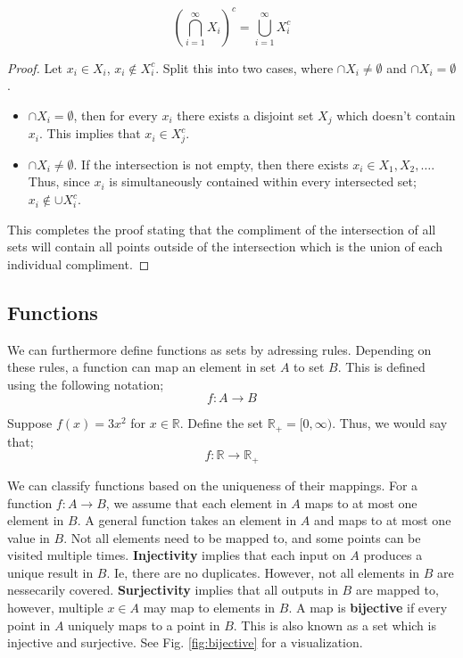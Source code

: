 \begin{theorem}
    \begin{equation}
            \left(\bigcap_{i=1}^\infty X_i\right)^c =     \bigcup_{i=1}^\infty X_i^c 
    \end{equation}
    \begin{proof}
        Let $x_i \in X_i$, $x_i\notin X_i^c$. Split this into two cases, where $\cap X_i \neq \emptyset$ and $\cap X_i = \emptyset$. 
        \begin{itemize}
            \item $\cap X_i = \emptyset$, then for every $x_i$ there exists a disjoint set $X_j$ which doesn't contain $x_i$. This implies that $x_i \in X^c_j$.
            \item $\cap X_i \neq \emptyset$. If the intersection is not empty, then there exists $x_i \in X_1, X_2, \dots$. Thus, since $x_i$ is simultaneously contained within every intersected set;  $x_i \notin \cup X_i^c$.
        \end{itemize}
        This completes the proof stating that the compliment of the intersection of all sets will contain all points outside of the intersection which is the union of each individual compliment. 
    \end{proof}
\end{theorem}

\subsection{Functions}

We can furthermore define functions as sets by adressing rules. Depending on these rules, a function can map an element in set $A$ to set $B$. This is defined using the following notation;
\begin{equation}
    f : A \rightarrow B
\end{equation}

\begin{example}
    Suppose $f(x) = 3x^2$ for $x\in \mathbb{R}$. Define the set $\mathbb{R}_+ = [0, \infty)$. Thus, we would say that;
    \begin{equation}
        f: \mathbb{R} \rightarrow \mathbb{R}_+
    \end{equation}
\end{example}

We can classify functions based on the uniqueness of their mappings. For a function $f: A \rightarrow B$, we assume that each element in $A$ maps to at most one element in $B$. A general function takes an element in $A$ and maps to at most one value in $B$. Not all elements need to be mapped to, and some points can be visited multiple times. \textbf{Injectivity} implies that each input on $A$ produces a unique result in $B$. Ie, there are no duplicates. However, not all elements in $B$ are nessecarily covered. \textbf{Surjectivity} implies that all outputs in $B$ are mapped to, however, multiple $x\in A$ may map to elements in $B$. A map is \textbf{bijective} if every point in $A$ uniquely maps to a point in $B$. This is also known as a set which is injective and surjective. See Fig. \ref{fig:bijective} for a visualization.

